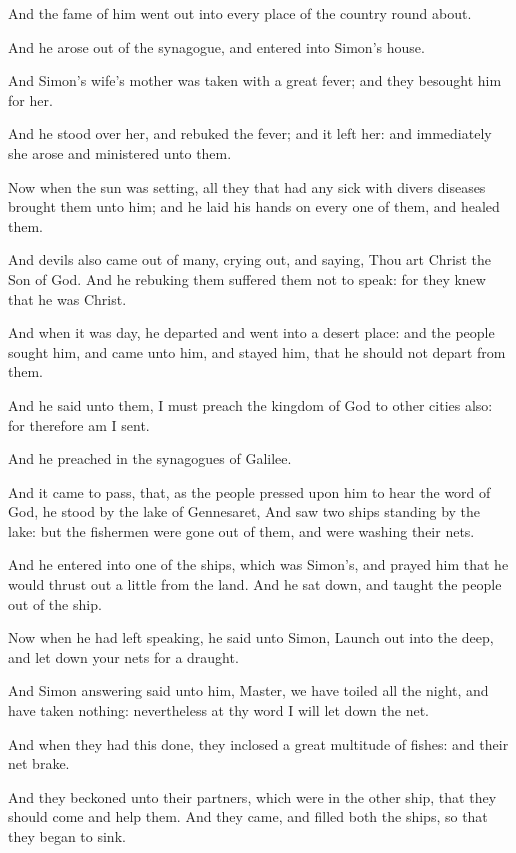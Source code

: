 \Verse And the fame of him went out into every place of the country round about.

\Verse And he arose out of the synagogue, and entered into Simon's house.

And Simon's wife's mother was taken with a great fever; and they besought him for her.

\Verse And he stood over her, and rebuked the fever; and it left her: and immediately she arose and ministered unto them.

\Verse Now when the sun was setting, all they that had any sick with divers diseases brought them unto him; and he laid his hands on every one of them, and healed them.

\Verse And devils also came out of many, crying out, and saying, Thou art Christ the Son of God. And he rebuking them suffered them not to speak: for they knew that he was Christ.

\Verse And when it was day, he departed and went into a desert place: and the people sought him, and came unto him, and stayed him, that he should not depart from them.

\Verse And he said unto them, I must preach the kingdom of God to other cities also: for therefore am I sent.

\Verse And he preached in the synagogues of Galilee.


\Chapter
\Verse And it came to pass, that, as the people pressed upon him to hear the word of God, he stood by the lake of Gennesaret, \Verse And saw two ships standing by the lake: but the fishermen were gone out of them, and were washing their nets.

\Verse And he entered into one of the ships, which was Simon's, and prayed him that he would thrust out a little from the land. And he sat down, and taught the people out of the ship.

\Verse Now when he had left speaking, he said unto Simon, Launch out into the deep, and let down your nets for a draught.

\Verse And Simon answering said unto him, Master, we have toiled all the night, and have taken nothing: nevertheless at thy word I will let down the net.

\Verse And when they had this done, they inclosed a great multitude of fishes: and their net brake.

\Verse And they beckoned unto their partners, which were in the other ship, that they should come and help them. And they came, and filled both the ships, so that they began to sink.

